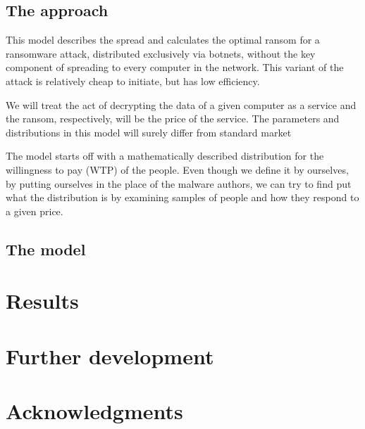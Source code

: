 \documentclass[11pt, a4paper]{article}
\begin{document}
	\subsection{The approach}
		This model describes the spread and calculates the optimal ransom for a ransomware attack, distributed exclusively via botnets, without the key component of spreading to every computer in the network. This variant of the attack is relatively cheap to initiate, but has low efficiency.\par
		We will treat the act of decrypting the data of a given computer as a service and the ransom, respectively, will be the price of the service. The parameters and distributions in this model will surely differ from standard market\par
		The model starts off with a mathematically described distribution for the willingness to pay (WTP) of the people. Even though we define it by ourselves, by putting ourselves in the place of the malware authors, we can try to find put what the distribution is by examining samples of people and how they respond to a given price.
	\subsection{The model}
\section{Results}
\section{Further development}
\section*{Acknowledgments}
\nocite{*}


\end{document}
